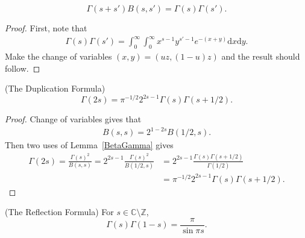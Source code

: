 \begin{lemma}
\label{BetaGamma}
\begin{equation}
\Gamma(s + s')B(s, s') = \Gamma(s)\Gamma(s'). \nonumber
\end{equation}
\end{lemma}
\begin{proof}
First, note that
\begin{align}
\Gamma(s)\Gamma(s') = \int_{0}^{\infty}\int_{0}^{\infty} x^{s-1}y^{s'-1}e^{-(x+y)} \mathrm{d}x \mathrm{d}y. \nonumber
\end{align}
Make the change of variables $(x, y) = (uz, (1-u)z)$ and the result should follow.
\end{proof}
\begin{theorem}
\label{DuplicationFormula}
(The Duplication Formula)
\begin{equation}
\Gamma(2s) = \pi^{-1/2} 2^{2s-1} \Gamma(s) \Gamma(s + 1/2). \nonumber
\end{equation}
\end{theorem}
\begin{proof}
Change of variables gives that
\begin{align}
B(s, s) = 2^{1-2s}B(1/2, s). \nonumber
\end{align}
Then two uses of Lemma~\ref{BetaGamma} gives
\begin{align}
\Gamma(2s) = \frac{\Gamma(s)^2}{B(s, s)}
= 2^{2s-1}\frac{\Gamma(s)^2}{B(1/2, s)}
&= 2^{2s-1}\frac{\Gamma(s)\Gamma(s + 1/2)}{\Gamma(1/2)}\nonumber \\
&= \pi^{-1/2} 2^{2s-1} \Gamma(s) \Gamma(s + 1/2). \nonumber
\end{align}
\end{proof}
\begin{theorem}
\label{ReflectionFormula}
(The Reflection Formula) For $s \in \mathbb{C}\setminus\mathbb{Z}$, 
\begin{equation}
\Gamma(s)\Gamma(1-s) = \frac{\pi}{\sin{\pi s}}. \nonumber
\end{equation} 
\end{theorem}
